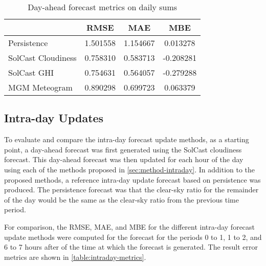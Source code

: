\begin{table}[!t]
	\centering
	\caption{Day-ahead forecast metrics on daily sums}
	\label{table:dayahead-metrics-sum}
	\begin{tabular}{lS[table-format=1.3]S[table-format=1.3]S[table-format=-1.3]}
		\toprule
		                       &   {RMSE}   &   {MAE}    &    {MBE}    \\
        \midrule
		Persistence & 1.501558 & 1.154667 & 0.013278 \\
		SolCast Cloudiness & 0.758310 & 0.583713 & -0.208281 \\
		SolCast GHI & 0.754631 & 0.564057 & -0.279288 \\
		MGM Meteogram & 0.890298 & 0.699723 & 0.063379 \\
		\bottomrule
	\end{tabular}
\end{table}


\subsection{Intra-day Updates}

To evaluate and compare the intra-day forecast update methods,
as a starting point, a day-ahead forecast was first generated using the
SolCast cloudiness forecast.
This day-ahead forecast was then updated for each hour of the day using each of the methods proposed in \cref{sec:method-intraday}.
In addition to the proposed methods, a reference intra-day update forecast based on persistence was produced.
The persistence forecast was that the clear-sky ratio for the remainder of the day would be the same as the clear-sky ratio from the previous time period.

For comparison, the RMSE, MAE, and MBE for the different intra-day forecast update methods were computed
for the forecast for the periods 0 to 1, 1 to 2, and 6 to 7 hours after of the time at which the forecast is generated.
The result error metrics are shown in \cref{table:intraday-metrics}.


